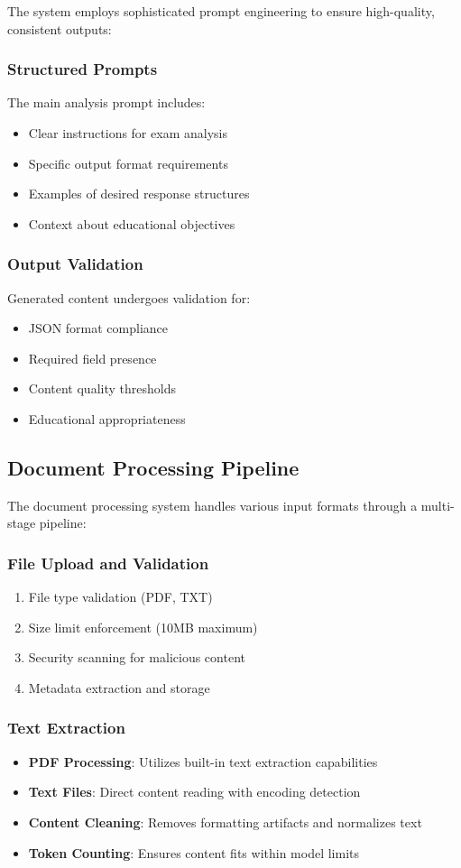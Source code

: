\documentclass[conference]{IEEEtran}
\begin{document}
The system employs sophisticated prompt engineering to ensure high-quality, consistent outputs:

\subsubsection{Structured Prompts}
The main analysis prompt includes:
\begin{itemize}
\item Clear instructions for exam analysis
\item Specific output format requirements
\item Examples of desired response structures
\item Context about educational objectives
\end{itemize}

\subsubsection{Output Validation}
Generated content undergoes validation for:
\begin{itemize}
\item JSON format compliance
\item Required field presence
\item Content quality thresholds
\item Educational appropriateness
\end{itemize}

\subsection{Document Processing Pipeline}

The document processing system handles various input formats through a multi-stage pipeline:

\subsubsection{File Upload and Validation}
\begin{enumerate}
\item File type validation (PDF, TXT)
\item Size limit enforcement (10MB maximum)
\item Security scanning for malicious content
\item Metadata extraction and storage
\end{enumerate}

\subsubsection{Text Extraction}
\begin{itemize}
\item \textbf{PDF Processing}: Utilizes built-in text extraction capabilities
\item \textbf{Text Files}: Direct content reading with encoding detection
\item \textbf{Content Cleaning}: Removes formatting artifacts and normalizes text
\item \textbf{Token Counting}: Ensures content fits within model limits
\end{itemize}
\end{document}
